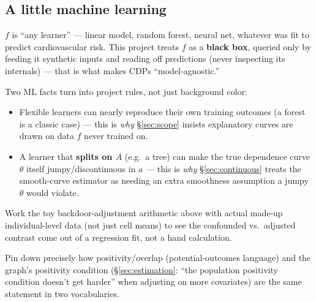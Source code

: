 \subsection{A little machine learning}

$f$ is ``any learner'' --- linear model, random forest, neural net, whatever
was fit to predict cardiovascular risk. This project treats $f$ as a
\textbf{black box}, queried only by feeding it synthetic inputs and reading
off predictions (never inspecting its internals) --- that is what makes CDPs
``model-agnostic.''

Two ML facts turn into project rules, not just background color:
\begin{itemize}
  \item Flexible learners can nearly reproduce their own training outcomes
    (a forest is a classic case) --- this is \emph{why}
    \S\ref{sec:scope} insists explanatory curves are drawn on data $f$ never
    trained on.
  \item A learner that \textbf{splits on $A$} (e.g.\ a tree) can make the
    true dependence curve $\theta$ itself jumpy/discontinuous in $a$ --- this
    is \emph{why} \S\ref{sec:continuous} treats the smooth-curve estimator as
    needing an extra smoothness assumption a jumpy $\theta$ would violate.
\end{itemize}

\begin{openquestions}
  \item Work the toy backdoor-adjustment arithmetic above with actual
    made-up individual-level data (not just cell means) to see the
    confounded vs.\ adjusted contrast come out of a regression fit, not a
    hand calculation.
  \item Pin down precisely how positivity/overlap (potential-outcomes
    language) and the graph's positivity condition
    (\S\ref{sec:estimation}: ``the population positivity condition doesn't
    get harder'' when adjusting on more covariates) are the same statement
    in two vocabularies.
\end{openquestions}
